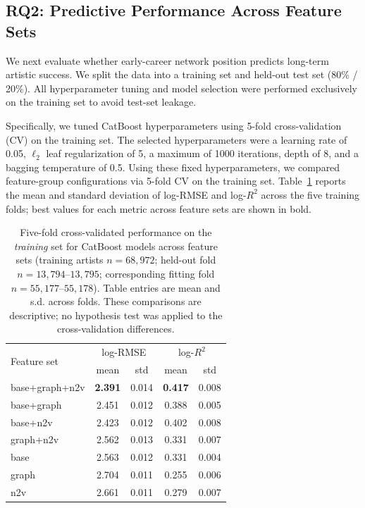 \documentclass[fleqn,10pt]{wlscirep}
\begin{document}
\subsection*{RQ2: Predictive Performance Across Feature Sets}

We next evaluate whether early-career network position predicts long-term artistic success. We split the data into a training set and held-out test set (80\% / 20\%). All hyperparameter tuning and model selection were performed exclusively on the training set to avoid test-set leakage.

Specifically, we tuned CatBoost hyperparameters using 5-fold cross-validation (CV) on the training set. The selected hyperparameters were a learning rate of 0.05, $\ell_2$ leaf regularization of 5, a maximum of 1000 iterations, depth of 8, and a bagging temperature of 0.5. Using these fixed hyperparameters, we compared feature-group configurations via 5-fold CV on the training set. Table~\ref{tab:cv_results} reports the mean and standard deviation of log-RMSE and log-$R^2$ across the five training folds; best values for each metric across feature sets are shown in bold.

\begin{table}[htbp]
\centering
\caption{Five-fold cross-validated performance on the \emph{training} set for CatBoost models across feature sets (training artists $n=68{,}972$; held-out fold $n=13{,}794$--$13{,}795$; corresponding fitting fold $n=55{,}177$--$55{,}178$). Table entries are mean and s.d. across folds. These comparisons are descriptive; no hypothesis test was applied to the cross-validation differences.}
\label{tab:cv_results}
\begin{tabular}{lcccc}
\hline
\multirow{2}{*}{Feature set} & \multicolumn{2}{c}{log-RMSE} & \multicolumn{2}{c}{log-$R^2$} \\
 & mean & std & mean & std \\
\hline
base+graph+n2v & \textbf{2.391} & 0.014 & \textbf{0.417} & 0.008 \\
base+graph     & 2.451         & 0.012 & 0.388          & 0.005 \\
base+n2v       & 2.423         & 0.012 & 0.402          & 0.008 \\
graph+n2v      & 2.562         & 0.013 & 0.331          & 0.007 \\
base           & 2.563         & 0.012 & 0.331          & 0.004 \\
graph          & 2.704         & 0.011 & 0.255          & 0.006 \\
n2v            & 2.661         & 0.011 & 0.279          & 0.007 \\
\hline
\end{tabular}
\end{table}
\end{document}
